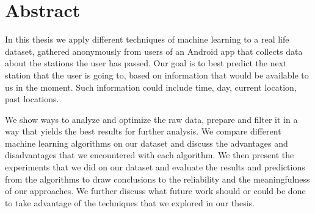 \section{Abstract}

In this thesis we apply different techniques of machine learning to a real life dataset, gathered anonymously from users of an Android app that collects data about the stations the user has passed. Our goal is to best predict the next station that the user is going to, based on information that would be available to us in the moment. Such information could include time, day, current location, past locations.

We show ways to analyze and optimize the raw data, prepare and filter it in a way that yields the best results for further analysis. We compare different machine learning algorithms on our dataset and discuss the advantages and disadvantages that we encountered with each algorithm. We then present the experiments that we did on our dataset and evaluate the results and predictions from the algorithms to draw conclusions to the reliability and the meaningfulness of our approaches. We further discuss what future work should or could be done to take advantage of the techniques that we explored in our thesis.
